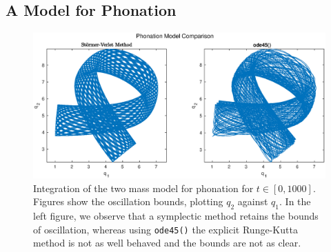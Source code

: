 \subsection{A Model for Phonation}


\begin{figure}
	\centering
	\includegraphics[width = \linewidth]{figures/phonationcomp.eps}
	\caption{
		Integration of the two mass model for phonation for $t \in [0, 1000]$.
		Figures show the oscillation bounds, plotting $q_2$ against $q_1$.
		In the left figure, we observe that a symplectic method retains the bounds of oscillation,
		whereas using \texttt{ode45()} the explicit Runge-Kutta method is not as well behaved and the bounds are not as clear. 
	}
	\label{fig:phon}
\end{figure}

